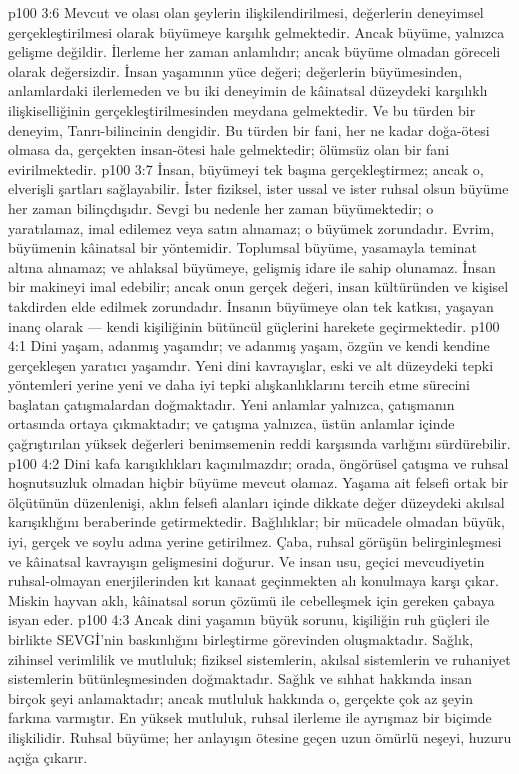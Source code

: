 \vs p100 3:6 Mevcut ve olası olan şeylerin ilişkilendirilmesi, değerlerin deneyimsel gerçekleştirilmesi olarak büyümeye karşılık gelmektedir. Ancak büyüme, yalnızca gelişme değildir. İlerleme her zaman anlamlıdır; ancak büyüme olmadan göreceli olarak değersizdir. İnsan yaşamının yüce değeri; değerlerin büyümesinden, anlamlardaki ilerlemeden ve bu iki deneyimin de kâinatsal düzeydeki karşılıklı ilişkiselliğinin gerçekleştirilmesinden meydana gelmektedir. Ve bu türden bir deneyim, Tanrı\hyp{}bilincinin dengidir. Bu türden bir fani, her ne kadar doğa\hyp{}ötesi olmasa da, gerçekten insan\hyp{}ötesi hale gelmektedir; ölümsüz olan bir fani evirilmektedir.
\vs p100 3:7 İnsan, büyümeyi tek başına gerçekleştirmez; ancak o, elverişli şartları sağlayabilir. İster fiziksel, ister ussal ve ister ruhsal olsun büyüme her zaman bilinçdışıdır. Sevgi bu nedenle her zaman büyümektedir; o yaratılamaz, imal edilemez veya satın alınamaz; o büyümek zorundadır. Evrim, büyümenin kâinatsal bir yöntemidir. Toplumsal büyüme, yasamayla teminat altına alınamaz; ve ahlaksal büyümeye, gelişmiş idare ile sahip olunamaz. İnsan bir makineyi imal edebilir; ancak onun gerçek değeri, insan kültüründen ve kişisel takdirden elde edilmek zorundadır. İnsanın büyümeye olan tek katkısı, yaşayan inanç olarak --- kendi kişiliğinin bütüncül güçlerini harekete geçirmektedir.
\vs p100 4:1 Dini yaşam, adanmış yaşamdır; ve adanmış yaşam, özgün ve kendi kendine gerçekleşen yaratıcı yaşamdır. Yeni dini kavrayışlar, eski ve alt düzeydeki tepki yöntemleri yerine yeni ve daha iyi tepki alışkanlıklarını tercih etme sürecini başlatan çatışmalardan doğmaktadır. Yeni anlamlar yalnızca, çatışmanın ortasında ortaya çıkmaktadır; ve çatışma yalnızca, üstün anlamlar içinde çağrıştırılan yüksek değerleri benimsemenin reddi karşısında varlığını sürdürebilir.
\vs p100 4:2 Dini kafa karışıklıkları kaçınılmazdır; orada, öngörüsel çatışma ve ruhsal hoşnutsuzluk olmadan hiçbir büyüme mevcut olamaz. Yaşama ait felsefi ortak bir ölçütünün düzenlenişi, aklın felsefi alanları içinde dikkate değer düzeydeki akılsal karışıklığını beraberinde getirmektedir. Bağlılıklar; bir mücadele olmadan büyük, iyi, gerçek ve soylu adına yerine getirilmez. Çaba, ruhsal görüşün belirginleşmesi ve kâinatsal kavrayışın gelişmesini doğurur. Ve insan usu, geçici mevcudiyetin ruhsal\hyp{}olmayan enerjilerinden kıt kanaat geçinmekten alı konulmaya karşı çıkar. Miskin hayvan aklı, kâinatsal sorun çözümü ile cebelleşmek için gereken çabaya isyan eder.
\vs p100 4:3 Ancak dini yaşamın büyük sorunu, kişiliğin ruh güçleri ile birlikte SEVGİ’nin baskınlığını birleştirme görevinden oluşmaktadır. Sağlık, zihinsel verimlilik ve mutluluk; fiziksel sistemlerin, akılsal sistemlerin ve ruhaniyet sistemlerin bütünleşmesinden doğmaktadır. Sağlık ve sıhhat hakkında insan birçok şeyi anlamaktadır; ancak mutluluk hakkında o, gerçekte çok az şeyin farkına varmıştır. En yüksek mutluluk, ruhsal ilerleme ile ayrışmaz bir biçimde ilişkilidir. Ruhsal büyüme; her anlayışın ötesine geçen uzun ömürlü neşeyi, huzuru açığa çıkarır.
